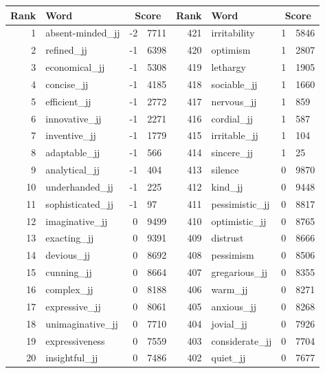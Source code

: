 \begin{table}[tbp]
    \begin{tabular}{| rlr@{.}l | rlr@{.}l |}
    \hline
    \textbf{Rank} & \textbf{Word} & \multicolumn{2}{c|}{\textbf{Score}} & \textbf{Rank} & \textbf{Word} & \multicolumn{2}{c|}{\textbf{Score}} \\
    \hline
    1 & absent-minded\_jj & -2 & 7711    &    421 & irritability & 1 & 5846 \\
    2 & refined\_jj & -1 & 6398    &    420 & optimism & 1 & 2807 \\
    3 & economical\_jj & -1 & 5308    &    419 & lethargy & 1 & 1905 \\
    4 & concise\_jj & -1 & 4185    &    418 & sociable\_jj & 1 & 1660 \\
    5 & efficient\_jj & -1 & 2772    &    417 & nervous\_jj & 1 & 859 \\
    6 & innovative\_jj & -1 & 2271    &    416 & cordial\_jj & 1 & 587 \\
    7 & inventive\_jj & -1 & 1779    &    415 & irritable\_jj & 1 & 104 \\
    8 & adaptable\_jj & -1 & 566    &    414 & sincere\_jj & 1 & 25 \\
    9 & analytical\_jj & -1 & 404    &    413 & silence & 0 & 9870 \\
    10 & underhanded\_jj & -1 & 225    &    412 & kind\_jj & 0 & 9448 \\
    11 & sophisticated\_jj & -1 & 97    &    411 & pessimistic\_jj & 0 & 8817 \\
    12 & imaginative\_jj & 0 & 9499    &    410 & optimistic\_jj & 0 & 8765 \\
    13 & exacting\_jj & 0 & 9391    &    409 & distrust & 0 & 8666 \\
    14 & devious\_jj & 0 & 8692    &    408 & pessimism & 0 & 8506 \\
    15 & cunning\_jj & 0 & 8664    &    407 & gregarious\_jj & 0 & 8355 \\
    16 & complex\_jj & 0 & 8188    &    406 & warm\_jj & 0 & 8271 \\
    17 & expressive\_jj & 0 & 8061    &    405 & anxious\_jj & 0 & 8268 \\
    18 & unimaginative\_jj & 0 & 7710    &    404 & jovial\_jj & 0 & 7926 \\
    19 & expressiveness & 0 & 7559    &    403 & considerate\_jj & 0 & 7704 \\
    20 & insightful\_jj & 0 & 7486    &    402 & quiet\_jj & 0 & 7677 \\

\end{tabular}
\end{table}
